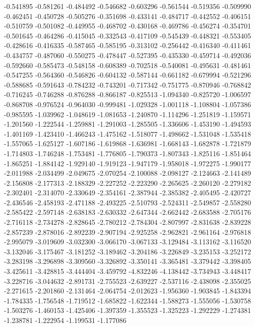 -0.541895
-0.581261
-0.484492
-0.546682
-0.603296
-0.561544
-0.519356
-0.509990
-0.462451
-0.450728
-0.505276
-0.351698
-0.433141
-0.484717
-0.442552
-0.406151
-0.510759
-0.501082
-0.449955
-0.468702
-0.430168
-0.469786
-0.456274
-0.354701
-0.501645
-0.464286
-0.415045
-0.332543
-0.417109
-0.545439
-0.448321
-0.553405
-0.428616
-0.416335
-0.587465
-0.585195
-0.313102
-0.256442
-0.416340
-0.411461
-0.434757
-0.487060
-0.550275
-0.478447
-0.527395
-0.435330
-0.459714
-0.492036
-0.592660
-0.585473
-0.548158
-0.608389
-0.702518
-0.540081
-0.495631
-0.481461
-0.547255
-0.564360
-0.546826
-0.604132
-0.587144
-0.661182
-0.679994
-0.521296
-0.588685
-0.591643
-0.784232
-0.743201
-0.717342
-0.751775
-0.870946
-0.768842
-0.716245
-0.746288
-0.876288
-0.866187
-0.825513
-1.094340
-0.825720
-1.006597
-0.868708
-0.976524
-0.964030
-0.999481
-1.029328
-1.001118
-1.108804
-1.057386
-0.985595
-1.039962
-1.048619
-1.081653
-1.240870
-1.114296
-1.251819
-1.159571
-1.201560
-1.222544
-1.259881
-1.291003
-1.285505
-1.336606
-1.453190
-1.494593
-1.401169
-1.423410
-1.466243
-1.475162
-1.518077
-1.498662
-1.531048
-1.535418
-1.557065
-1.625127
-1.607186
-1.619868
-1.636981
-1.668143
-1.682878
-1.721879
-1.714803
-1.746248
-1.753481
-1.776805
-1.790373
-1.807343
-1.825116
-1.851464
-1.865251
-1.884142
-1.929140
-1.919123
-1.947179
-1.958018
-1.972275
-1.990177
-2.011988
-2.034499
-2.049675
-2.070254
-2.100088
-2.098127
-2.124663
-2.141489
-2.156808
-2.177313
-2.188329
-2.227252
-2.223290
-2.265625
-2.260120
-2.279182
-2.302401
-2.314070
-2.330649
-2.354161
-2.387944
-2.385382
-2.405495
-2.420727
-2.436546
-2.458193
-2.471188
-2.493225
-2.510793
-2.524311
-2.549857
-2.558280
-2.585422
-2.597148
-2.638183
-2.630332
-2.647344
-2.662442
-2.683588
-2.705176
-2.716118
-2.734278
-2.828645
-2.780212
-2.784304
-2.807997
-2.831638
-2.839228
-2.857239
-2.878016
-2.892239
-2.907194
-2.925258
-2.962821
-2.961164
-2.976818
-2.995079
-3.019609
-3.032300
-3.066170
-3.067133
-3.129484
-3.113162
-3.116520
-3.132046
-3.175467
-3.181252
-3.189462
-3.204186
-3.226849
-3.235153
-3.252172
-3.283198
-3.296898
-3.309560
-3.326892
-3.350141
-3.365481
-3.379442
-3.398405
-3.425611
-3.428815
-3.444404
-3.459792
-4.832246
-4.138442
-3.734943
-3.448417
-3.228716
-3.044632
-2.891731
-2.755523
-2.639227
-2.537116
-2.438098
-2.355025
-2.271615
-2.201860
-2.131464
-2.064754
-2.012623
-1.956360
-1.903845
-1.843394
-1.784335
-1.756548
-1.719512
-1.685822
-1.622344
-1.588273
-1.555056
-1.530758
-1.503276
-1.460153
-1.425406
-1.397359
-1.355523
-1.325223
-1.292229
-1.274381
-1.238781
-1.222954
-1.199531
-1.177086
